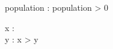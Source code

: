 \documentclass[a4paper,10pt,fleqn]{article}
\begin{document}
\begin{axdef}
population : \nat
\where
population > 0
\end{axdef}

\begin{axdef}
x : \nat \\
y : \nat
\where
x > y
\end{axdef}
\end{document}
